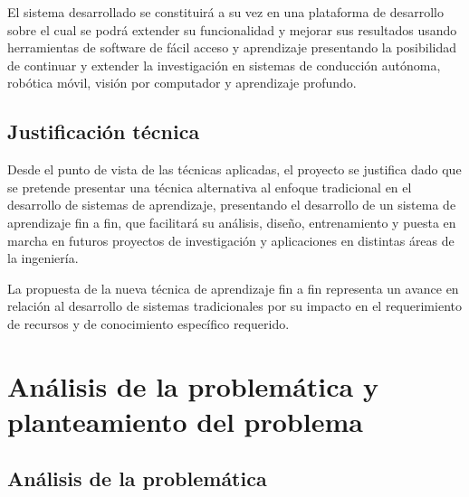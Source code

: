 El sistema desarrollado se constituirá a su vez en una plataforma de desarrollo sobre el cual se podrá 
extender su funcionalidad y mejorar sus resultados usando herramientas de software de fácil acceso y aprendizaje 
presentando la posibilidad de continuar y extender la investigación en sistemas de conducción autónoma, robótica móvil, 
visión por computador y aprendizaje profundo.

\subsection{Justificación técnica}

Desde el punto de vista de las técnicas aplicadas, el proyecto se justifica dado que se pretende presentar una técnica 
alternativa al enfoque tradicional en el desarrollo de sistemas de aprendizaje, presentando el desarrollo de un sistema 
de aprendizaje fin a fin, que facilitará su análisis, diseño, entrenamiento y puesta en marcha en futuros proyectos 
de investigación y aplicaciones en distintas áreas de la ingeniería. 

La propuesta de la nueva técnica de aprendizaje fin a fin representa un avance en relación al desarrollo de sistemas 
tradicionales por su impacto en el requerimiento de recursos y de conocimiento específico requerido.



\section{Análisis de la problemática y \\
planteamiento del problema}
\subsection{Análisis de la problemática}

